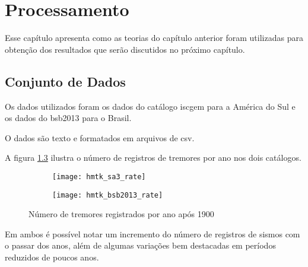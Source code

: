 \chapter{Processamento}
\label{cap:processamento}

Esse capítulo apresenta como as teorias do capítulo anterior foram utilizadas para obtenção 
dos resultados que serão discutidos no próximo capítulo.

\section{Conjunto de Dados}
\label{sec:dados}

Os dados utilizados foram os dados do catálogo \gls{iscgem} \citep{storchak_2013} 
para a América do Sul e 
os dados do \glsdesc{bsb2013} \citep{bsb2013} para o Brasil.

O dados são texto e formatados em arquivos de \gls{csv}.

A figura \ref{fig:eq_record} ilustra o número de registros de tremores por ano nos dois catálogos.

\begin{figure}[H]
	\centering
	\begin{subfigure}[b]{0.48\textwidth}
		  	\centering
			\texttt{[image: hmtk\_sa3\_rate]}
			\label{fig:sa_eq_record}
	\end{subfigure}%
	\quad %
	\begin{subfigure}[b]{0.48\textwidth}
		  	\centering
			\texttt{[image: hmtk\_bsb2013\_rate]}
			\label{fig:br_eq_record}
    \end{subfigure}%
	\caption{Número de tremores registrados por ano após 1900}
	\label{fig:eq_record}
\end{figure}

Em ambos é possível notar um incremento do número de registros de sismos com o passar dos anos, 
além de algumas variações bem destacadas em períodos reduzidos de poucos anos.



